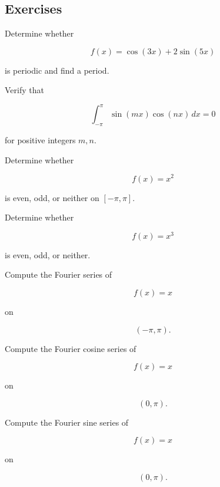 \subsection{Exercises}
\label{subsec:fourier-analysis-exercises}

\begin{exercise}[1]
Determine whether

\[
f(x)=\cos(3x)+2\sin(5x)
\]

is periodic and find a period.
\end{exercise}

\begin{exercise}[1]
Verify that

\[
\int_{-\pi}^{\pi}
\sin(mx)\cos(nx)\,dx=0
\]

for positive integers \(m,n\).
\end{exercise}

\begin{exercise}[1]
Determine whether

\[
f(x)=x^2
\]

is even, odd, or neither on \([-\pi,\pi]\).
\end{exercise}

\begin{exercise}[1]
Determine whether

\[
f(x)=x^3
\]

is even, odd, or neither.
\end{exercise}

\begin{exercise}[2]
Compute the Fourier series of

\[
f(x)=x
\]

on

\[
(-\pi,\pi).
\]
\end{exercise}

\begin{exercise}[2]
Compute the Fourier cosine series of

\[
f(x)=x
\]

on

\[
(0,\pi).
\]
\end{exercise}

\begin{exercise}[2]
Compute the Fourier sine series of

\[
f(x)=x
\]

on

\[
(0,\pi).
\]
\end{exercise}

